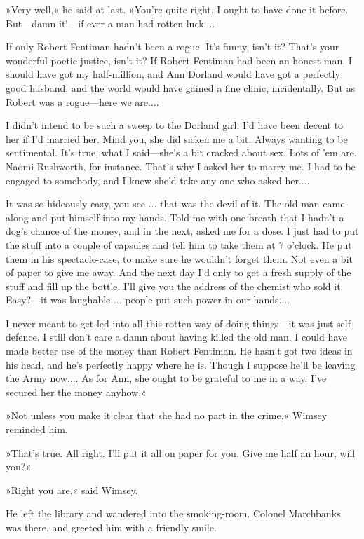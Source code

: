 »Very well,« he said at last. »You're quite right. I ought to have done it before. But\allowbreak---\allowbreak damn it!---if ever a man had rotten luck....

If only Robert Fentiman hadn't been a rogue. It's funny, isn't it? That's your wonderful poetic justice, isn't it? If Robert Fentiman had been an honest man, I should have got my half-million, and Ann Dorland would have got a perfectly good husband, and the world would have gained a fine clinic, incidentally. But as Robert was a rogue\allowbreak---\allowbreak here we are....

I didn't intend to be such a sweep to the Dorland girl. I'd have been decent to her if I'd married her. Mind you, she did sicken me a bit. Always wanting to be sentimental. It's true, what I said\allowbreak---\allowbreak she's a bit cracked about sex. Lots of 'em are. Naomi Rushworth, for instance. That's why I asked her to marry me. I had to be engaged to somebody, and I knew she'd take any one who asked her....

It was so hideously easy, you see ... that was the devil of it. The old man came along and put himself into my hands. Told me with one breath that I hadn't a dog's chance of the money, and in the next, asked me for a dose. I just had to put the stuff into a couple of capsules and tell him to take them at 7 o'clock. He put them in his spectacle-case, to make sure he wouldn't forget them. Not even a bit of paper to give me away. And the next day I'd only to get a fresh supply of the stuff and fill up the bottle. I'll give you the address of the chemist who sold it. Easy?---it was laughable ... people put such power in our hands....

I never meant to get led into all this rotten way of doing things\allowbreak---\allowbreak it was just self-defence. I still don't care a damn about having killed the old man. I could have made better use of the money than Robert Fentiman. He hasn't got two ideas in his head, and he's perfectly happy where he is. Though I suppose he'll be leaving the Army now.... As for Ann, she ought to be grateful to me in a way. I've secured her the money anyhow.«

»Not unless you make it clear that she had no part in the crime,« Wimsey reminded him.

»That's true. All right. I'll put it all on paper for you. Give me half an hour, will you?«

»Right you are,« said Wimsey.

He left the library and wandered into the smoking-room. Colonel Marchbanks was there, and greeted him with a friendly smile.

